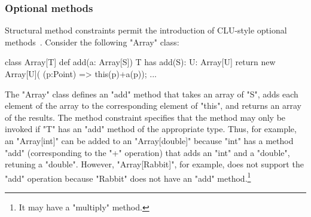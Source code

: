 \subsubsection{Optional methods}

Structural method constraints permit the introduction of
CLU-style optional methods~\cite{clu}.  Consider the following
\xcd"Array" class:
{
\begin{xten}
class Array[T] {
  def add(a: Array[S])
    {T has add(S): U}: Array[U] {
    return new Array[U](
      (p:Point) => this(p)+a(p));
  }
  ...
}
\end{xten}}

\noindent
The \xcd"Array" class defines an \xcd"add" method that takes 
an array of \xcd"S", adds each element of the array to the
corresponding element of \xcd"this", and returns an array of the
results.  The method constraint specifies that the method may
only be invoked if \xcd"T" has an \xcd"add" method of the
appropriate type.  Thus, for example, an \xcd"Array[int]"
can be added to an \xcd"Array[double]" because \xcd"int"
has a method \xcd"add" (corresponding to the \xcd"+" operation)
that adds an \xcd"int" and a \xcd"double", retuning a
\xcd"double".  However, \xcd"Array[Rabbit]", for example, does not support
the \xcd"add" operation because \xcd"Rabbit" does not have an
\xcd"add" method.\footnote{It may have a \xcd"multiply" method.}




